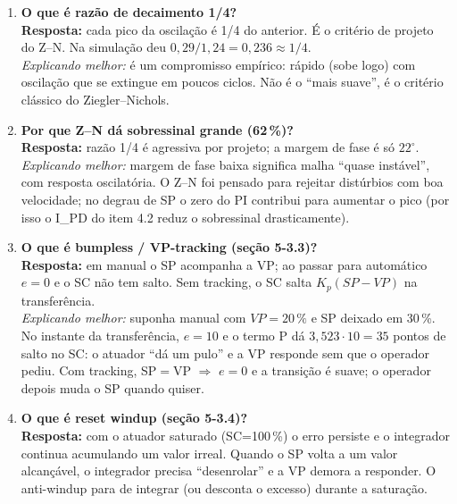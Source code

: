 \documentclass[11pt,a4paper]{article}
\begin{document}
\begin{enumerate}[leftmargin=*]
\textbf{Resposta:} o experimento é degrau no SP. A sintonia de distúrbio, aplicada a um degrau de SP, dá sobressinal de 84\,\% (FOPDT).\\
\emph{Explicando melhor:} ``ponto fixo'' (\emph{set point}) e ``distúrbio'' são dois problemas diferentes. A correlação de López minimiza o IAE para um distúrbio de carga e por isso usa $K_p$ alto, $T_i$ curto ($38{,}9$ s contra $112$ s). Aplicada ao SP, vira uma resposta muito oscilatória.
\item \textbf{O que é razão de decaimento 1/4?}\\
\textbf{Resposta:} cada pico da oscilação é 1/4 do anterior. É o critério de projeto do Z--N. Na simulação deu $0{,}29/1{,}24=0{,}236\approx1/4$.\\
\emph{Explicando melhor:} é um compromisso empírico: rápido (sobe logo) com oscilação que se extingue em poucos ciclos. Não é o ``mais suave'', é o critério clássico do Ziegler--Nichols.
\item \textbf{Por que Z--N dá sobressinal grande (62\,\%)?}\\
\textbf{Resposta:} razão 1/4 é agressiva por projeto; a margem de fase é só $22^\circ$.\\
\emph{Explicando melhor:} margem de fase baixa significa malha ``quase instável'', com resposta oscilatória. O Z--N foi pensado para rejeitar distúrbios com boa velocidade; no degrau de SP o zero do PI contribui para aumentar o pico (por isso o I\_PD do item 4.2 reduz o sobressinal drasticamente).
\item \textbf{O que é bumpless / VP-tracking (seção 5-3.3)?}\\
\textbf{Resposta:} em manual o SP acompanha a VP; ao passar para automático $e=0$ e o SC não tem salto. Sem tracking, o SC salta $K_p(SP-VP)$ na transferência.\\
\emph{Explicando melhor:} suponha manual com $VP=20\,\%$ e SP deixado em 30\,\%. No instante da transferência, $e=10$ e o termo P dá $3{,}523\cdot10=35$ pontos de salto no SC: o atuador ``dá um pulo'' e a VP responde sem que o operador pediu. Com tracking, SP$=$VP $\Rightarrow$ $e=0$ e a transição é suave; o operador depois muda o SP quando quiser.
\item \textbf{O que é reset windup (seção 5-3.4)?}\\
\textbf{Resposta:} com o atuador saturado (SC=100\,\%) o erro persiste e o integrador continua acumulando um valor irreal. Quando o SP volta a um valor alcançável, o integrador precisa ``desenrolar'' e a VP demora a responder. O anti-windup para de integrar (ou desconta o excesso) durante a saturação.\\

\end{enumerate}
\end{document}
